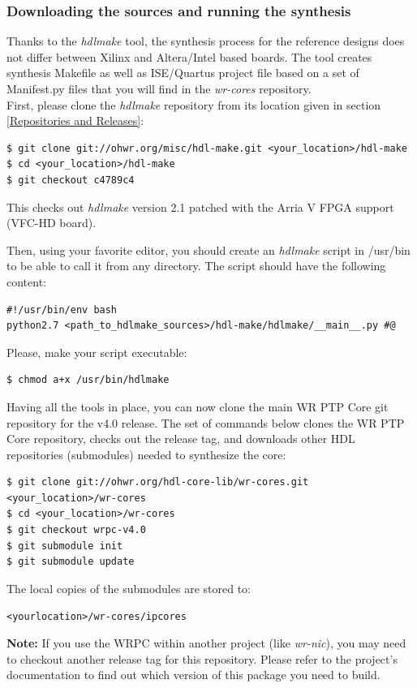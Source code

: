 \documentclass[a4paper, 12pt]{article}
\renewcommand{\_}{\underscore\allowbreak}
\begin{document}
\subsubsection{Downloading the sources and running the synthesis}
Thanks to the \textit{hdlmake} tool, the synthesis process for the reference
designs does not differ between Xilinx and Altera/Intel based boards. The tool creates
synthesis Makefile as well as ISE/Quartus project file based on a set of
Manifest.py files that you will find in the \textit{wr-cores} repository.\\

First, please clone the \textit{hdlmake} repository from its location given in
section \ref{Repositories and Releases}:
\begin{lstlisting}
$ git clone git://ohwr.org/misc/hdl-make.git <your_location>/hdl-make
$ cd <your_location>/hdl-make
$ git checkout c4789c4
\end{lstlisting}
This checks out \textit{hdlmake} version 2.1 patched with the Arria V FPGA
support (VFC-HD board).

Then, using your favorite editor, you should create an \textit{hdlmake} script in
/usr/bin to be able to call it from any directory. The script should have the
following content:
\begin{lstlisting}
#!/usr/bin/env bash
python2.7 <path_to_hdlmake_sources>/hdl-make/hdlmake/__main__.py #@
\end{lstlisting}

Please, make your script executable:
\begin{lstlisting}
$ chmod a+x /usr/bin/hdlmake
\end{lstlisting}

Having all the tools in place, you can now clone the main WR PTP Core git
repository for the v4.0 release. The set of commands below clones the WR PTP Core
repository, checks out the release tag, and downloads other HDL repositories
(submodules) needed to synthesize the core:
\begin{lstlisting}
$ git clone git://ohwr.org/hdl-core-lib/wr-cores.git <your_location>/wr-cores
$ cd <your_location>/wr-cores
$ git checkout wrpc-v4.0
$ git submodule init
$ git submodule update
\end{lstlisting}

The local copies of the submodules are stored to:

\texttt{<your\_location>/wr-cores/ip\_cores}

\vspace{1em}
\textbf{Note:} If you use the WRPC within another project (like
\textit{wr-nic}), you may need to checkout another release tag for this
repository. Please refer to the project's documentation to find out which
version of this package you need to build.
\end{document}
